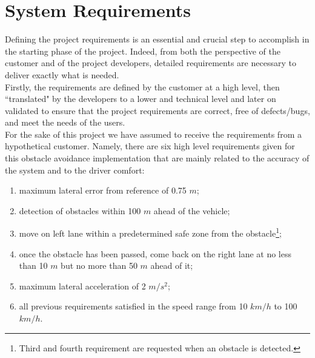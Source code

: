 \section{System Requirements} \label{System_Requirements}


Defining the project requirements is an essential and crucial step to accomplish in the starting phase of the project. Indeed, from both the perspective of the customer and of the project developers, detailed requirements are necessary to deliver exactly what is needed.\\
Firstly, the requirements are defined by the customer at a high level, then ``translated" by the developers to a lower and technical level and later on validated to ensure that the project requirements are correct, free of defects/bugs, and meet the needs of the users.\\
For the sake of this project we have assumed to receive the requirements from a hypothetical customer.
Namely, there are six high level requirements given for this obstacle avoidance implementation that are mainly related to the accuracy of the system and to the driver comfort:
\begin{enumerate}
    \item maximum lateral error from reference of 0.75 $m$;
    \item detection of obstacles within 100 $m$ ahead of the vehicle;
    \item move on left lane within a predetermined safe zone from the obstacle\footnote{Third and fourth requirement are requested when an obstacle is detected.};
    \item once the obstacle has been passed, come back on the right lane at no less than 10 $m$ but no more than 50 $m$ ahead of it;
    \item maximum lateral acceleration of 2 $m/s^2$;
    \item all previous requirements satisfied in the speed range from 10 $km/h$ to 100 $km/h$.
\end{enumerate}
